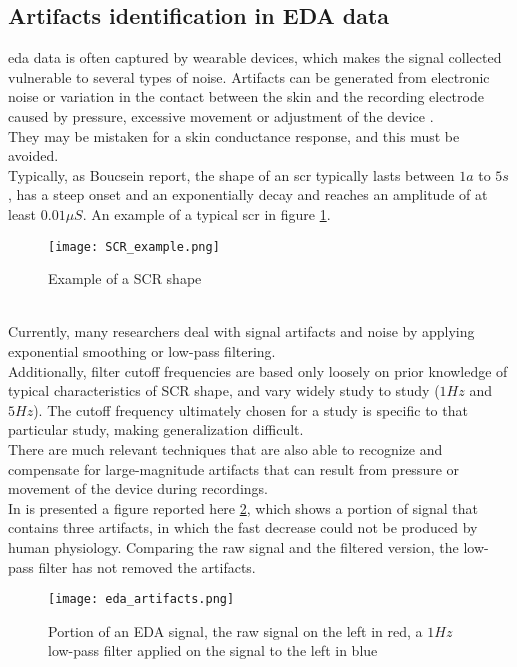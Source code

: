 \subsection{Artifacts identification in EDA data}
\gls{eda} data is often captured by wearable devices, which makes the signal collected vulnerable to several types of noise. Artifacts can be generated from electronic noise or variation in the contact between the skin and the recording electrode caused by pressure, excessive movement or adjustment of the device \cite{taylor2015automatic}.
\\
They may be mistaken for a skin conductance response, and this must be avoided.
\\ \indent
Typically, as Boucsein \cite{boucsein2012electrodermal} report, the shape of an \gls{scr} typically lasts between $1a$ to $5s$, has a steep onset and an exponentially decay and reaches an amplitude of at least $0.01 \mu S$. An example of a typical \gls{scr} in figure \ref{fig:SCR_example}.
\begin{figure}[h]
    \centering
    \texttt{[image: SCR\_example.png]} 
	\caption{Example of a SCR shape}
    \label{fig:SCR_example}
\end{figure}
\\
Currently, many researchers deal with signal artifacts and noise by applying exponential smoothing or low-pass filtering.
\\
Additionally, filter cutoff frequencies are based only loosely on prior knowledge of typical characteristics of SCR shape, and vary widely study to study ($1Hz$ and $5Hz$). The cutoff frequency ultimately chosen for a study is specific to that particular study, making generalization difficult.
\\ \indent
There are much relevant techniques that are also able to recognize and compensate for large-magnitude artifacts that can result from pressure or movement of the device during recordings.
\\
In \cite{taylor2015automatic} is presented a figure reported here \ref{fig:eda_artifacts}, which shows a portion of signal that contains three artifacts, in which the fast decrease could not be produced by human physiology. Comparing the raw signal and the filtered version, the low-pass filter has not removed the artifacts.
\begin{figure}[h]
    \centering
    \texttt{[image: eda\_artifacts.png]} 
	\caption{Portion of an EDA signal, the raw signal on the left in red, a $1Hz$ low-pass filter applied on the signal to the left in blue}
    \label{fig:eda_artifacts}
\end{figure}
